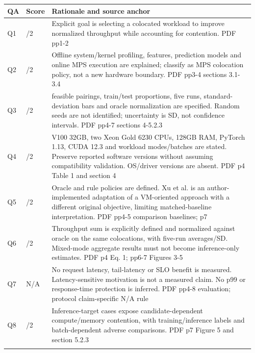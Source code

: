 \begin{longtable}{>{\raggedright\arraybackslash}p{}>{\raggedright\arraybackslash}p{}>{\raggedright\arraybackslash}p{}}
\toprule
\textbf{QA} & \textbf{Score} & \textbf{Rationale and source anchor}\\\midrule\endhead
Q1 & 2/2 & Explicit goal is selecting a colocated workload to improve normalized throughput while accounting for contention. PDF pp1-2\\\addlinespace
Q2 & 2/2 & Offline system/kernel profiling,\allowbreak{} features,\allowbreak{} prediction models and online MPS execution are explained;\allowbreak{} classify as MPS colocation policy,\allowbreak{} not a new hardware boundary. PDF pp3-4 sections 3.1-3.4\\\addlinespace
Q3 & 2/2 & 181 feasible pairings,\allowbreak{} train/test proportions,\allowbreak{} five runs,\allowbreak{} standard-deviation bars and oracle normalization are specified. Random seeds are not identified;\allowbreak{} uncertainty is SD,\allowbreak{} not confidence intervals. PDF pp4-7 sections 4-5.2.3\\\addlinespace
Q4 & 2/2 & V100 32GB,\allowbreak{} two Xeon Gold 6230 CPUs,\allowbreak{} 128GB RAM,\allowbreak{} PyTorch 1.13,\allowbreak{} CUDA 12.3 and workload modes/batches are stated. Preserve reported software versions without assuming compatibility validation. OS/driver versions are absent. PDF p4 Table 1 and section 4\\\addlinespace
Q5 & 1/2 & Oracle and rule policies are defined. Xu et al. is an author-implemented adaptation of a VM-oriented approach with a different original objective,\allowbreak{} limiting matched-baseline interpretation. PDF pp4-5 comparison baselines;\allowbreak{} p7\\\addlinespace
Q6 & 2/2 & Throughput sum is explicitly defined and normalized against oracle on the same colocations,\allowbreak{} with five-run averages/SD. Mixed-mode aggregate results must not become inference-only estimates. PDF p4 Eq. 1;\allowbreak{} pp6-7 Figures 3-5\\\addlinespace
Q7 & N/A & No request latency,\allowbreak{} tail-latency or SLO benefit is measured. Latency-sensitive motivation is not a measured claim. No p99 or response-time protection is inferred. PDF pp4-8 evaluation;\allowbreak{} protocol claim-specific N/A rule\\\addlinespace
Q8 & 2/2 & Inference-target cases expose candidate-dependent compute/memory contention,\allowbreak{} with training/inference labels and batch-dependent adverse comparisons. PDF p7 Figure 5 and section 5.2.3\\\addlinespace

\end{longtable}
